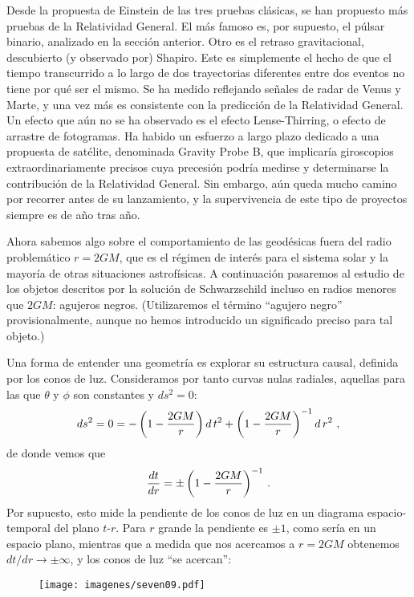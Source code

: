 \documentclass[11pt,b5paper,openany,twoside]{book}
\begin{document}
Desde la propuesta de Einstein de las tres pruebas clásicas, se han propuesto más pruebas de la Relatividad General.
El más famoso es, por supuesto, el púlsar binario, analizado en la sección anterior.
Otro es el retraso gravitacional, descubierto (y observado por) Shapiro.
Este es simplemente el hecho de que el tiempo transcurrido a lo largo de dos trayectorias diferentes entre dos eventos no tiene por qué ser el mismo.
Se ha medido reflejando señales de radar de Venus y Marte, y una vez más es consistente con la predicción de la Relatividad General.
Un efecto que aún no se ha observado es el efecto Lense-Thirring, o efecto de arrastre de fotogramas.
Ha habido un esfuerzo a largo plazo dedicado a una propuesta de satélite, denominada Gravity Probe B, que implicaría giroscopios extraordinariamente precisos cuya precesión podría medirse y determinarse la contribución de la Relatividad General.
Sin embargo, aún queda mucho camino por recorrer antes de su lanzamiento, y la supervivencia de este tipo de proyectos siempre es de año tras año.

Ahora sabemos algo sobre el comportamiento de las geodésicas fuera del radio problemático $r=2GM$, que es el régimen de interés para el sistema solar y la mayoría de otras situaciones astrofísicas.
A continuación pasaremos al estudio de los objetos descritos por la solución de Schwarzschild incluso en radios menores que $2GM$: agujeros negros.
(Utilizaremos el término ``agujero negro'' provisionalmente, aunque no hemos introducido un significado preciso para tal objeto.)

Una forma de entender una geometría es explorar su estructura causal, definida por los conos de luz.
Consideramos por tanto curvas nulas radiales, aquellas para las que $\theta$ y $\phi$ son constantes y $ds^2=0$:
\begin{equation}
ds^2 = 0 = -\left(1-{{2GM}\over r}\right) d\,t^2
+\left(1-{{2GM}\over r}\right)^{-1} d\,r^2 \ ,\label{7.63}
\end{equation}
de donde vemos que
\begin{equation}
{{dt}\over{dr}}=\pm \left(1-{{2GM}\over r}\right)^{-1}\,.\label{7.64}
\end{equation}
Por supuesto, esto mide la pendiente de los conos de luz en un diagrama espacio-temporal del plano $t$-$r$.
Para $r$ grande la pendiente es $\pm 1$, como sería en un espacio plano, mientras que a medida que nos acercamos a $r=2GM$ obtenemos $dt/dr\rightarrow \pm\infty$, y los conos de luz ``se acercan'':

\begin{figure}[h]
\centering
\texttt{[image: imagenes/seven09.pdf]}
\end{figure}
\end{document}
